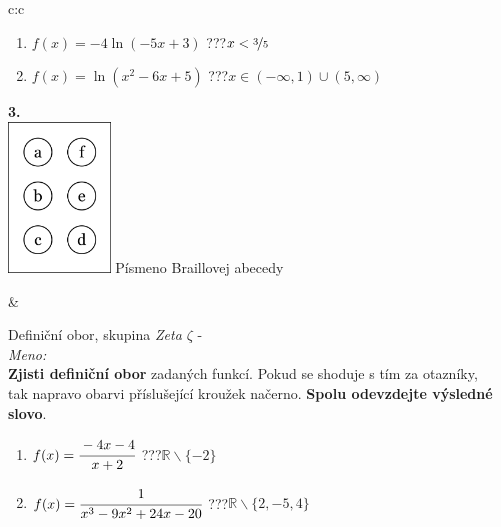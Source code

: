 \documentclass[10pt]{report}
\begin{document}
\begin{tabular}{c:c}
\begin{minipage}[c][99mm][t]{0.49\linewidth}
\begin{center}
\begin{minipage}{0.77\linewidth}
\begin{center}
\begin{varwidth}{\textwidth}
\begin{enumerate}
\item $f(x)=-4\ln{(-5x+3)}$\quad \dotfill\; ???\;\dotfill \quad $x<\nicefrac{3}{5}$
\item $f(x)=\ln{(x^2-6x+5)}$\quad \dotfill\; ???\;\dotfill \quad $x\in(-\infty , 1)\cup(5 , \infty)$
\end{enumerate}
\end{varwidth}
\end{center}
\end{minipage}
\begin{minipage}{0.20\linewidth}
\begin{center}
{\Huge\bfseries 3.} \\[2mm]
\includegraphics[height=40mm]{../images/braille.png}
{\small Písmeno Braillovej abecedy}
\end{center}
\end{minipage}
\end{center}
\end{minipage}
&
\begin{minipage}[c][99mm][t]{0.49\linewidth}
\begin{center}
\vspace{7mm}
{\huge Definiční obor, skupina \textit{Zeta $\zeta$} -}\\[4.5mm]
\textit{Meno:}\phantom{xxxxxxxxxxxxxxxxxxxxxxxxxxxxxxxxxxxxxxxxxxxxxxxxxxxxxxxxxxxxxxxxx}\\[3.5mm]
\textbf{Zjisti definiční obor} zadaných funkcí. Pokud se shoduje s tím za otazníky,\\tak napravo obarvi příslušející kroužek načerno. \textbf{Spolu odevzdejte výsledné slovo}.\\[3mm]
\begin{minipage}{0.77\linewidth}
\begin{center}
\begin{varwidth}{\textwidth}
\begin{enumerate}
\normalsize
\item $f(x)=\cfrac{-4x-4}{x+2}$\quad \dotfill\; ???\;\dotfill \quad $\mathbb{R}\smallsetminus\{-2\}$
\item $f(x)=\cfrac{1}{x^3-9x^2+24x-20}$\quad \dotfill\; ???\;\dotfill \quad $\mathbb{R}\smallsetminus\{2,-5,4\}$

\end{enumerate}
\end{varwidth}
\end{center}
\end{minipage}
\end{center}
\end{minipage}
\end{tabular}
\end{document}
